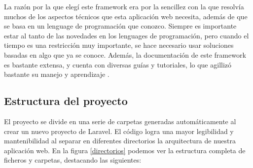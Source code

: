 La razón por la que elegí este framework era por la sencillez con la que resolvía muchos de los aspectos técnicos que esta aplicación web necesita, además de que se basa en un lenguage de programación que conozco. Siempre es importante estar al tanto de las novedades en los lenguages de programación, pero cuando el tiempo es una restricción muy importante, se hace necesario usar soluciones basadas en algo que ya se conoce. Además, la documentación de este framework es bastante extensa, y cuenta con diversas guías y tutoriales, lo que agillizó bastante su manejo y aprendizaje \cite{laraveldocs}.

\subsection{Estructura del proyecto}
El proyecto se divide en una serie de carpetas generadas automáticamente al crear un nuevo proyecto de Laravel. El código logra una mayor legibilidad y mantenibilidad al separar en diferentes directorios la arquitectura de nuestra aplicación web. En la figura \ref{directorios} podemos ver la estructura completa de ficheros y carpetas, destacando las siguientes:

